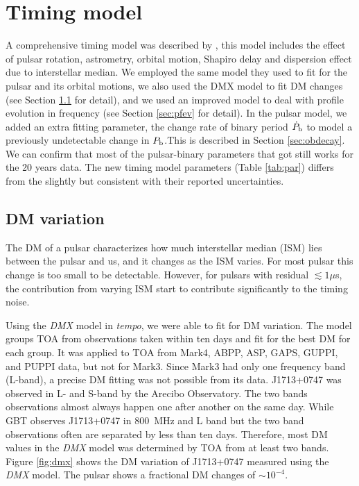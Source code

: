 \section{Timing model}
\label{timing_model}
A comprehensive timing model was described by \citet{sns+05}, this model includes the effect of pulsar rotation, astrometry, orbital motion, Shapiro delay and dispersion effect due to interstellar median.
We employed the same \citet{dd86} model they used to fit for the pulsar and its orbital motions, we also used the DMX model to fit DM changes (see Section \ref{sec:dmx} for detail), and we used an improved model to deal with profile evolution in frequency (see Section \ref{sec:pfev} for detail). 
In the pulsar model, we added an extra fitting parameter, the change rate of binary period $\dot{P}_{\rm b}$ to model a previously undetectable change in $P_{\rm b}$.This is described in Section \ref{sec:obdecay}.    
We can confirm that most of the pulsar-binary parameters that \citet{sns+05} got still works for the 20 years data. The new timing model parameters (Table \ref{tab:par}) differs from the \citet{sns+05} slightly but consistent with their reported uncertainties.


\subsection{DM variation}
\label{sec:dmx}
The DM of a pulsar characterizes how much interstellar median (ISM) lies
between the pulsar and us, and it changes as the ISM varies. For most pulsar
this change is too small to be detectable. However, for pulsars with residual
$\lesssim1\mu$s, the contribution from varying ISM start to contribute
significantly to the timing noise. 

Using the {\it DMX} model in {\it tempo}, we were able to fit for DM
variation. 
The model groups TOA from observations taken within ten days and fit for the
best DM for each group.   
It was applied to TOA from Mark4, ABPP, ASP, GAPS, GUPPI, and PUPPI data, but
not for Mark3. Since Mark3 had only one frequency band (L-band), a precise DM
fitting was not possible from its data.
J1713+0747 was observed in L- and S-band by the Arecibo Observatory. The
two bands observations almost always happen one after another on the same day.
While GBT observes J1713+0747 in 800~MHz and L band but the two band
observations often are separated by less than ten days.
Therefore, most DM values in the {\it DMX} model was determined by TOA from at
least two bands. Figure \ref{fig:dmx} shows the DM variation of J1713+0747 
measured using the {\it DMX} model.
The pulsar shows a fractional DM changes of $\sim10^{-4}$.



